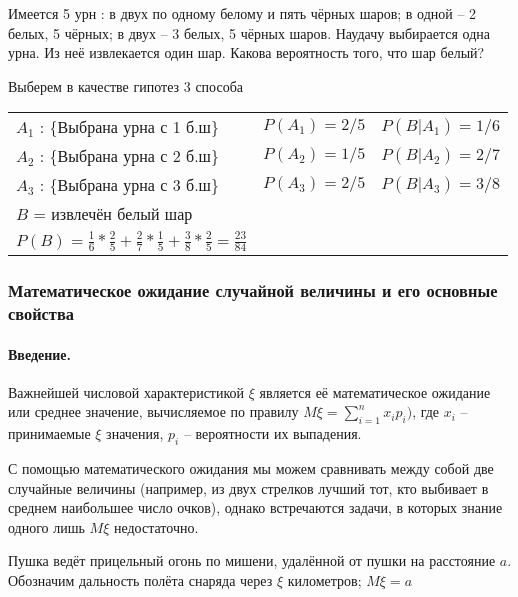 ﻿\documentclass[a4paper,12pt]{report}
\begin{document}
	
	 Имеется 5 урн : в двух по одному белому и пять чёрных шаров; в одной – 2 белых, 5 чёрных; в двух – 3 белых, 5 чёрных шаров. Наудачу выбирается одна урна. Из неё извлекается один шар. Какова вероятность того, что шар белый?

	 Выберем в качестве гипотез 3 способа \strut


	\begin{tabular}{ll@{\qquad}l}
	
		$A_1$ : \{Выбрана урна с 1 б.ш\} &  $P(A_1) = 2/5$ & $P(B|A_1) = 1/6$ \\
	
		$A_2$ : \{Выбрана урна с 2 б.ш\} & $P(A_2) = 1/5$ & $P(B|A_2) = 2/7$ \\
	
		$A_3$ : \{Выбрана урна с 3 б.ш\} & $P(A_3) = 2/5$ & $P(B|A_3) = 3/8$ \\
	
		$B$ = {извлечён белый шар} \qquad & & \\
		$P(B) = \frac{1}{6} * \frac{2}{5} + \frac{2}{7} * \frac{1}{5} + \frac{3}{8} * \frac{2}{5} = \frac{23}{84}$
	
	\end{tabular}





\subsubsection{Математическое ожидание случайной величины и его основные свойства}



	\paragraph{Введение.}

	Важнейшей числовой характеристикой $\xi$ является её математическое ожидание или среднее значение, вычисляемое по правилу $M\xi = \sum\limits^n_{i=1}x_ip_i)$, где $x_i$ – принимаемые $\xi$ значения, $p_i$ – вероятности их выпадения. 

	С помощью математического ожидания мы можем сравнивать между собой две случайные величины (например, из двух стрелков лучший тот, кто выбивает в среднем наибольшее число очков), однако встречаются задачи, в которых знание одного лишь $M\xi$ недостаточно. 


	 Пушка ведёт прицельный огонь по мишени, удалённой от пушки на расстояние $a$. Обозначим дальность полёта снаряда через $\xi$ километров; $M\xi = a$
\end{document}
